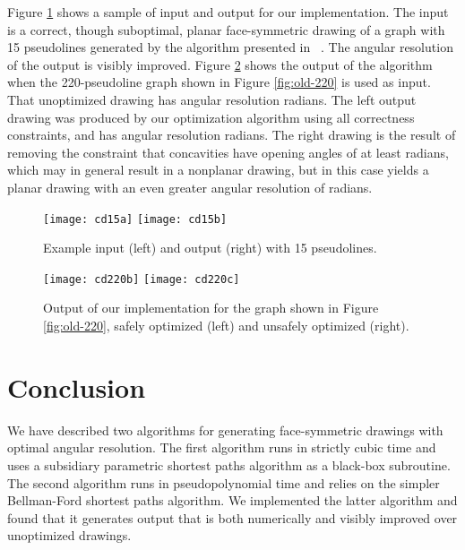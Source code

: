 \documentclass[11pt,letter]{article}
\begin{document}
Figure \ref{figure:cd15} shows a sample of input and output for our implementation.  The input is a correct, though suboptimal, planar face-symmetric drawing of a graph with 15 pseudolines generated by the algorithm presented in ~\cite{Epp-GD-04}.  The angular resolution of the output is visibly improved.  Figure \ref{figure:cd220} shows the output of the algorithm when the 220-pseudoline graph shown in Figure \ref{fig:old-220} is used as input.  That unoptimized drawing has angular resolution  radians.  The left output drawing was produced by our optimization algorithm using all correctness constraints, and has angular resolution  radians.  The right drawing is the result of removing the constraint that concavities have opening angles of at least  radians, which may in general result in a nonplanar drawing, but in this case yields a planar drawing with an even greater angular resolution of  radians.

\begin{figure}[t]
\centering
\texttt{[image: cd15a]} \texttt{[image: cd15b]}
\caption{Example input (left) and output (right) with 15 pseudolines.}
\label{figure:cd15}
\end{figure}

\begin{figure}[t]
\centering
\texttt{[image: cd220b]} \texttt{[image: cd220c]}
\caption{Output of our implementation for the graph shown in Figure \ref{fig:old-220}, safely optimized (left) and unsafely optimized (right).}
\label{figure:cd220}
\end{figure}

\section{Conclusion}

We have described two algorithms for generating face-symmetric drawings with optimal angular resolution.  The first algorithm runs in strictly cubic time and uses a subsidiary parametric shortest paths algorithm as a black-box subroutine.  The second algorithm runs in pseudopolynomial time and relies on the simpler Bellman-Ford shortest paths algorithm.  We implemented the latter algorithm and found that it generates output that is both numerically and visibly improved over unoptimized drawings.
\end{document}
